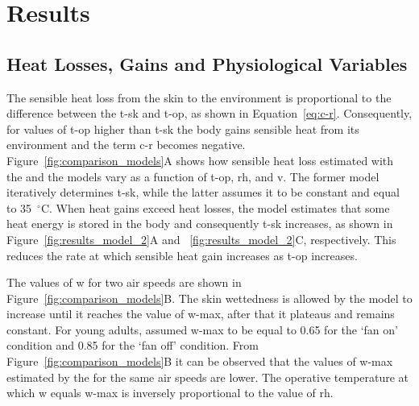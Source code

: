 
\section{Results}\label{sec:results}

\subsection{Heat Losses, Gains and Physiological Variables}\label{subsec:res-heat-loss-physiological}

The sensible heat loss from the skin to the environment is proportional to the difference between the \ac{t-sk} and \ac{t-op}, as shown in Equation~\ref{eq:c-r}.
Consequently, for values of \ac{t-op} higher than \ac{t-sk} the body gains sensible heat from its environment and the term \ac{c-r} becomes negative.
Figure~\ref{fig:comparison_models}A shows how sensible heat loss estimated with the  and the  models vary as a function of \ac{t-op}, \ac{rh}, and \ac{v}.
The former model iteratively determines \ac{t-sk}, while the latter assumes it to be constant and equal to 35~$^{\circ}$C\@.
When heat gains exceed heat losses, the  model estimates that some heat energy is stored in the body and consequently \ac{t-sk} increases, as shown in Figure~\ref{fig:results_model_2}A and ~\ref{fig:results_model_2}C, respectively.
This reduces the rate at which sensible heat gain increases as \ac{t-op} increases.

The values of \ac{w} for two air speeds are shown in Figure~\ref{fig:comparison_models}B\@.
The skin wettedness is allowed by the model to increase until it reaches the value of \ac{w-max}, after that it plateaus and remains constant.
For young adults,  assumed \ac{w-max} to be equal to 0.65 for the `fan on' condition and 0.85 for the `fan off' condition.
From Figure~\ref{fig:comparison_models}B it can be observed that the values of \ac{w-max} estimated by the  for the same air speeds are lower.
The operative temperature at which \ac{w} equals \ac{w-max} is inversely proportional to the value of \ac{rh}.

